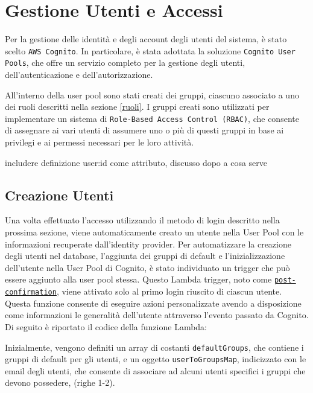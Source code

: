 \section{Gestione Utenti e Accessi}

Per la gestione delle identità e degli account degli utenti del sistema, è stato scelto \texttt{AWS Cognito}. In particolare, è stata adottata la soluzione \texttt{Cognito User Pools}, che offre un servizio completo per la gestione degli utenti, dell'autenticazione e dell'autorizzazione.

All'interno della user pool sono stati creati dei gruppi, ciascuno associato a uno dei ruoli descritti nella sezione \ref{ruoli}. 
I gruppi creati sono utilizzati per implementare un sistema di \texttt{Role-Based Access Control (RBAC)}, che consente di assegnare ai vari utenti di assumere uno o più di questi gruppi in base ai privilegi e ai permessi necessari per le loro attività.

includere definizione user:id come attributo, discusso dopo a cosa serve

\subsection{Creazione Utenti}

Una volta effettuato l'accesso utilizzando il metodo di login descritto nella prossima sezione, viene automaticamente creato un utente nella User Pool con le informazioni recuperate dall'identity provider.
Per automatizzare la creazione degli utenti nel database, l'aggiunta dei gruppi di default e l'inizializzazione dell'utente nella User Pool di Cognito, è stato individuato un trigger che può essere aggiunto alla user pool stessa. Questo Lambda trigger, noto come \href{https://docs.aws.amazon.com/cognito/latest/developerguide/user-pool-lambda-post-confirmation.html}{\texttt{post-confirmation}}, viene attivato solo al primo login riuscito di ciascun utente. Questa funzione consente di eseguire azioni personalizzate avendo a disposizione come informazioni le generalità dell'utente attraverso l'evento passato da Cognito. Di seguito è riportato il codice della funzione Lambda:



Inizialmente, vengono definiti un array di costanti \texttt{defaultGroups}, che contiene i gruppi di default per gli utenti, e un oggetto \texttt{userToGroupsMap}, indicizzato con le email degli utenti, che consente di associare ad alcuni utenti specifici i gruppi che devono possedere,  (righe 1-2).

